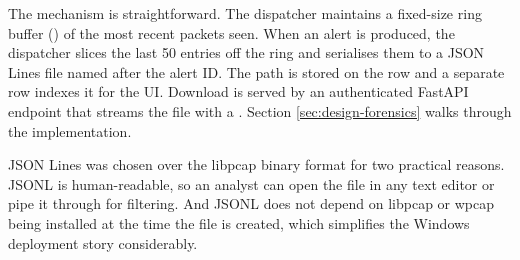 The mechanism is straightforward. The dispatcher maintains a
fixed-size ring buffer () of the most recent
packets seen. When an alert is produced, the dispatcher slices the
last 50 entries off the ring and serialises them to a JSON Lines file
named after the alert ID. The path is stored on the
 row and a separate  row indexes it for
the UI. Download is served by an authenticated FastAPI endpoint that
streams the file with a . Section
\ref{sec:design-forensics} walks through the implementation.

JSON Lines was chosen over the libpcap binary format for two
practical reasons. JSONL is human-readable, so an analyst can open
the file in any text editor or pipe it through  for
filtering. And JSONL does not depend on libpcap or wpcap being
installed at the time the file is created, which simplifies the
Windows deployment story considerably.
